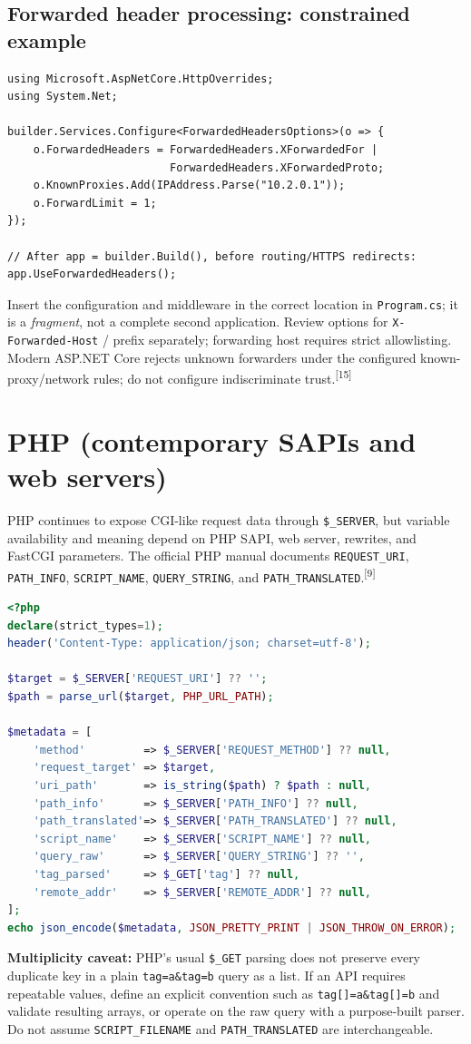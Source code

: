 \documentclass[10pt,letterpaper,oneside]{article}
\newcommand{\refs}[1]{\textsuperscript{\color{blue}[#1]}}
\newcommand{\code}[1]{\texttt{#1}}
\begin{document}
\subsection{Forwarded header processing: constrained example}
\begin{lstlisting}[language=CSharpLite,caption={Use only behind the stated, controlled proxy}]
using Microsoft.AspNetCore.HttpOverrides;
using System.Net;

builder.Services.Configure<ForwardedHeadersOptions>(o => {
    o.ForwardedHeaders = ForwardedHeaders.XForwardedFor |
                         ForwardedHeaders.XForwardedProto;
    o.KnownProxies.Add(IPAddress.Parse("10.2.0.1"));
    o.ForwardLimit = 1;
});

// After app = builder.Build(), before routing/HTTPS redirects:
app.UseForwardedHeaders();
\end{lstlisting}
Insert the configuration and middleware in the correct location in \code{Program.cs}; it is a \emph{fragment}, not a complete second application. Review options for \code{X-Forwarded-Host} / prefix separately; forwarding host requires strict allowlisting. Modern ASP.NET Core rejects unknown forwarders under the configured known-proxy/network rules; do not configure indiscriminate trust.\refs{15}

\section{PHP (contemporary SAPIs and web servers)}
PHP continues to expose CGI-like request data through \code{\$\_SERVER}, but variable availability and meaning depend on PHP SAPI, web server, rewrites, and FastCGI parameters. The official PHP manual documents \code{REQUEST\_URI}, \code{PATH\_INFO}, \code{SCRIPT\_NAME}, \code{QUERY\_STRING}, and \code{PATH\_TRANSLATED}.\refs{9}
\begin{lstlisting}[language=PHP,caption={PHP request metadata inspection (development only)}]
<?php
declare(strict_types=1);
header('Content-Type: application/json; charset=utf-8');

$target = $_SERVER['REQUEST_URI'] ?? '';
$path = parse_url($target, PHP_URL_PATH);

$metadata = [
    'method'         => $_SERVER['REQUEST_METHOD'] ?? null,
    'request_target' => $target,
    'uri_path'       => is_string($path) ? $path : null,
    'path_info'      => $_SERVER['PATH_INFO'] ?? null,
    'path_translated'=> $_SERVER['PATH_TRANSLATED'] ?? null,
    'script_name'    => $_SERVER['SCRIPT_NAME'] ?? null,
    'query_raw'      => $_SERVER['QUERY_STRING'] ?? '',
    'tag_parsed'     => $_GET['tag'] ?? null,
    'remote_addr'    => $_SERVER['REMOTE_ADDR'] ?? null,
];
echo json_encode($metadata, JSON_PRETTY_PRINT | JSON_THROW_ON_ERROR);
\end{lstlisting}
\textbf{Multiplicity caveat:} PHP's usual \code{\$\_GET} parsing does not preserve every duplicate key in a plain \code{tag=a\&tag=b} query as a list. If an API requires repeatable values, define an explicit convention such as \code{tag[]=a\&tag[]=b} and validate resulting arrays, or operate on the raw query with a purpose-built parser. Do not assume \code{SCRIPT\_FILENAME} and \code{PATH\_TRANSLATED} are interchangeable.
\end{document}
